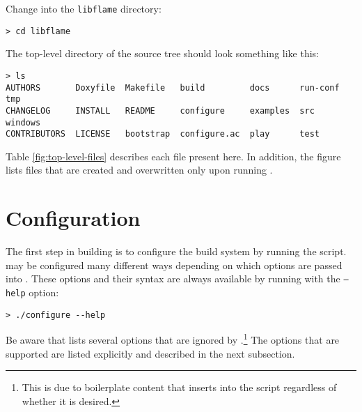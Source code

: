 \noindent
Change into the {\tt libflame} directory:

\begin{Verbatim}[frame=single,framesep=2.5mm,xleftmargin=5mm,commandchars=\\\{\},fontsize=\footnotesize]
> cd libflame
\end{Verbatim}

\noindent
The top-level directory of the source tree should look something like this:

\begin{Verbatim}[frame=single,framesep=2.5mm,xleftmargin=5mm,commandchars=\\\{\},fontsize=\footnotesize]
> ls
AUTHORS       Doxyfile  Makefile   build         docs      run-conf  tmp
CHANGELOG     INSTALL   README     configure     examples  src       windows
CONTRIBUTORS  LICENSE   bootstrap  configure.ac  play      test
\end{Verbatim}

\noindent
Table \ref{fig:top-level-files} describes each file present here.
In addition, the figure lists files that are created and overwritten
only upon running \configurens.




\section{Configuration}


The first step in building \libflame is to configure the build system by
running the \configure script.
\libflame may be configured many different ways depending on which options
are passed into \configurens.
These options and their syntax are always available by running \configure
with the {\tt --help} option:

\begin{Verbatim}[frame=single,framesep=2.5mm,xleftmargin=5mm,commandchars=\\\{\},fontsize=\footnotesize]
> ./configure --help
\end{Verbatim}

\noindent
Be aware that \configurehelp lists several options that are ignored by
\libflamens.\footnote{This is due to boilerplate content that \autoconf 
inserts into the \configure script regardless of whether it is desired.}
The options that are supported are listed explicitly and described in
the next subsection.

